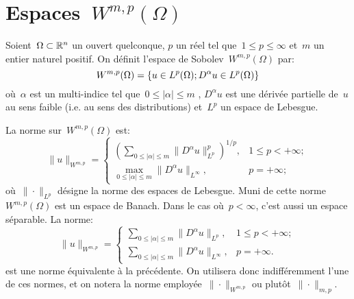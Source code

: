 \medskip
{}





\medskip
\section{Espaces~$W^{m,p}(\Omega)$}

\begin{definition}
Soient~$\Omega \subset \mathbb R^n$ un ouvert quelconque, $p$ un réel tel que~$1\leqslant p\leqslant \infty$
et~$m$ un entier naturel positif.
On définit l'espace de Sobolev~$W^{m,p}(\Omega)$ par:
\begin{equation}\label{Eq-SoboW}\colorred
W^{m, p}(\Omega)=\{u\in L^p(\Omega); D^\alpha u \in L^p(\Omega)\}
\end{equation}
où~$\alpha$ est un multi-indice tel que~$0\leqslant |\alpha| \leqslant m$ , $D^\alpha u$ est une
dérivée partielle de~$u$ au sens faible (i.e. au sens des distributions) et~$L^p$ un espace de Lebesgue.
\end{definition}

\medskip
La norme sur~$W^{m,p}(\Omega)$ est:
\begin{equation}
\| u \|_{W^{m, p}} = \begin{cases} \left( \sum \limits_{0\leqslant | \alpha | \leqslant m} \| D^{\alpha} u \|_{L^{p}}^{p} \right)^{1/p}, & 1 \leqslant p < + \infty; \\ \max\limits _{0\leqslant | \alpha | \leqslant m} \| D^{\alpha} u \|_{L^{\infty}}, & p = + \infty; \end{cases}
\end{equation}
où~$\|\cdot\|_{L^{p}}$ désigne la norme des espaces de Lebesgue.
Muni de cette norme~$W^{m,p}(\Omega)$ est un espace de Banach.
Dans le cas où~$p<\infty$, c'est aussi un espace séparable.
\medskipvm
La norme:
\begin{equation}
\| u \|_{W^{m, p}} = \begin{cases} \sum\limits _{0\leqslant | \alpha | \leqslant m} \| D^{\alpha} u \|_{L^{p}}, & 1 \leqslant p < + \infty; \\ \sum\limits _{0 \leqslant | \alpha | \leqslant m} \| D^{\alpha} u \|_{L^{\infty}}, & p = + \infty. \end{cases} \end{equation}
est une norme équivalente à la précédente.
On utilisera donc indifféremment l'une de ces normes, et on notera la norme
employée~$\|\cdot\|_{W^{m, p}}$ ou plutôt~$\|\cdot\|_{m, p}$.

